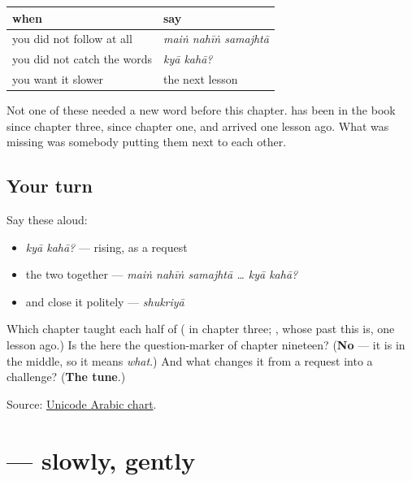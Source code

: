 \begin{grammarlens}[title={Grammar Lens: the repair kit, in three sentences}]
\noindent
\begin{tabularx}{\linewidth}{@{}>{\raggedright\arraybackslash}X>{\raggedright\arraybackslash}X@{}}
\toprule
\textbf{when} & \textbf{say} \\
\midrule
you did not follow at all & \emph{maiṅ nahīṅ samajhtā} \\
you did not catch the words & \emph{kyā kahā?} \\
you want it slower & the next lesson \\
\bottomrule
\end{tabularx}

Not one of these needed a new word before this chapter. \textbf{} has been in the book since chapter three, \textbf{} since chapter one, and \textbf{} arrived one lesson ago. What was missing was somebody putting them next to each other.
\end{grammarlens}

\subsection*{Your turn}
Say these aloud:

\begin{itemize}
\raggedright
  \item \emph{kyā kahā?} — rising, as a request
  \item the two together — \emph{maiṅ nahīṅ samajhtā … kyā kahā?}
  \item and close it politely — \emph{shukriyā}
\end{itemize}

\begin{tcolorbox}[breakable,colback=teal!4,colframe=teal!35!black,title={Before you move on}]
Which chapter taught each half of \textbf{ } (\textbf{} in chapter three; \textbf{}, whose past this is, one lesson ago.) Is the \textbf{} here the question-marker of chapter nineteen? (\textbf{No} — it is in the middle, so it means \emph{what}.) And what changes it from a request into a challenge? (\textbf{The tune}.)

Source: \href{https://www.unicode.org/charts/PDF/U0600.pdf}{Unicode Arabic chart}.
\end{tcolorbox}
\section[\texorpdfstring{\ur{آرام} \ur{سے} (ārām se)}{آرام سے (ārām se)}]{  — slowly, gently}

